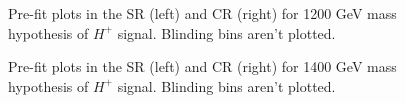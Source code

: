 \begin{figure}[H]
  \centering
  \caption{Pre-fit plots in the SR (left) and CR (right) for 1200 GeV mass hypothesis of $H^{+}$ signal. Blinding bins aren't plotted.}
  \label{fig:Prefit_Hp1200_Blind}
\end{figure}
\begin{figure}[H]
  \centering
  \caption{Pre-fit plots in the SR (left) and CR (right) for 1400 GeV mass hypothesis of $H^{+}$ signal. Blinding bins aren't plotted.}
  \label{fig:Prefit_Hp1400_Blind}
\end{figure}
